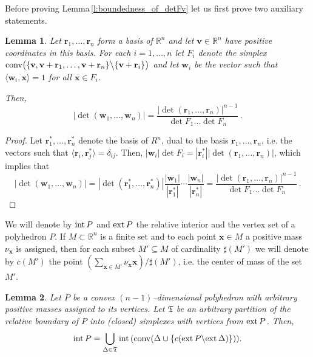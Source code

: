 \documentclass[11pt]{article}
\theoremstyle{definition}
\theoremstyle{remark}
\theoremstyle{plain}
\newtheorem{lemma}{Lemma}
\renewcommand{\vec}[1]{\mathbf{#1}}
\newcommand{\conv}{\textup{conv}}
\newcommand{\ext}{\textup{ext\,}}
\newcommand{\interior}{\textup{int\,}}
\newcommand{\R}{\mathbb{R}}
\begin{document}
  Before proving Lemma\,\ref{l:boundedness_of_detFv} let us first prove two auxiliary
  statements.

  \begin{lemma} \label{l:boundedness_of_detFv_simplicial_case}
  Let $\vec r_1,\ldots,\vec r_n$ form a basis of $\R^n$ and let $\vec v\in\R^n$ have positive
  coordinates in this basis. For each $i=1,\ldots,n$ let $F_i$ denote
  the simplex $ \conv\big(\{ \vec v,\vec v+\vec r_1,\ldots,\vec v+\vec r_n \}
  \big\backslash\{ \vec v+\vec r_i \}\big) $ and let $\vec w_i$ be the vector such that
  $\langle\vec w_i,\vec x\rangle=1$ for all $\vec x\in F_i$.

  Then,
  \[ |\det(\vec w_1,\ldots,\vec w_n)|=
     \frac{|\det(\vec r_1,\ldots,\vec r_n)|^{n-1}}{\det F_1\ldots\det F_n}\,. \]
  \end{lemma}

  \begin{proof}
    Let $\vec r_1^\ast,\ldots,\vec r_n^\ast$ denote the basis of $R^n$, dual to the basis
    $\vec r_1,\ldots,\vec r_n$, i.e. the vectors such that
    $\langle\vec r_i,\vec r_j^\ast\rangle=\delta_{ij}$. Then,
    $|\vec w_i|\det F_i=|\vec r_i^\ast||\det(\vec r_1,\ldots,\vec r_n)|$, which implies
    that
    \[ |\det(\vec w_1,\ldots,\vec w_n)|=|\det(\vec r_1^\ast,\ldots,\vec r_n^\ast)|
       \dfrac{|\vec w_1|}{|\vec r_1^\ast|}\cdots\dfrac{|\vec w_n|}{|\vec r_n^\ast|}=
       \dfrac{|\det(\vec r_1,\ldots,\vec r_n)|^{n-1}}{\det F_1\ldots\det F_n}\,. \]
  \end{proof}

  We will denote by $\interior P$ and $\ext P$ the relative interior and the vertex set of a
  polyhedron $P$.
  If $M\subset\R^n$ is a finite set and to each point $\vec x\in M$ a positive mass
  $\nu_{\vec x}$ is assigned, then for each subset $M'\subseteq M$ of cardinality
  $\sharp(M')$ we will denote by $c(M')$ the point
  $(\sum_{\vec x\in M'}\nu_{\vec x}\vec x)/\sharp(M')$, i.e. the center of mass of the set
  $M'$.

  \begin{lemma} \label{l:on_triangulations_and_coverings}
    Let $P$ be a convex $(n-1)$--dimensional polyhedron with arbitrary positive masses
    assigned to its vertices. Let $\mathfrak T$ be an arbitrary partition of the relative
    boundary of $P$ into (closed) simplexes with vertices from $\ext P$. Then,
    \[ \interior P=\bigcup_{\Delta\in\mathfrak T}
       \interior(\conv(\Delta\cup\{ c(\ext P\backslash\ext\Delta) \})). \]
  \end{lemma}
\end{document}
